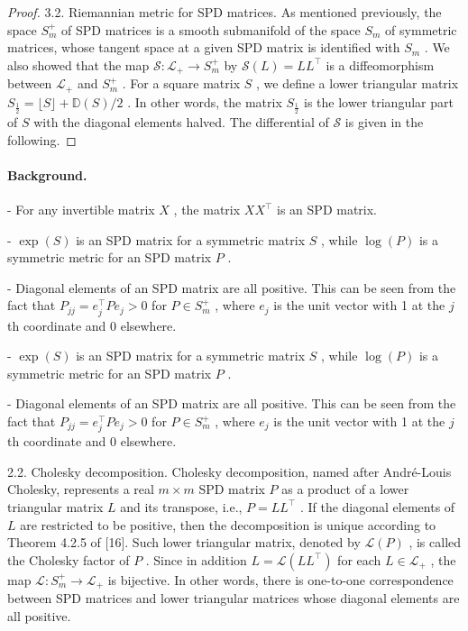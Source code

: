 \documentclass[11pt]{article}
\begin{document}
\begin{proof}
3.2. Riemannian metric for SPD matrices. As mentioned previously, the space  $S_{m}^{+}$  of SPD matrices is a smooth submanifold of the space  $S_{m}$  of symmetric matrices, whose tangent space at a given SPD matrix is identified with  $S_{m}$ . We also showed that the map  $\mathcal{S}:\mathcal{L}_{+}\to S_{m}^{+}$  by  $\mathcal{S}(L) = LL^{\top}$  is a diffeomorphism between  $\mathcal{L}_{+}$  and  $S_{m}^{+}$ . For a square matrix  $S$ , we define a lower triangular matrix  $S_{\frac{1}{2}} = \lfloor S\rfloor +\mathbb{D}(S) / 2$ . In other words, the matrix  $S_{\frac{1}{2}}$  is the lower triangular part of  $S$  with the diagonal elements halved. The differential of  $\mathcal{S}$  is given in the following.

\end{proof}

\paragraph{Background.}
- For any invertible matrix  $X$ , the matrix  $XX^{\top}$  is an SPD matrix.

-  $\exp(S)$  is an SPD matrix for a symmetric matrix  $S$ , while  $\log(P)$  is a symmetric metric for an SPD matrix  $P$ .

- Diagonal elements of an SPD matrix are all positive. This can be seen from the fact that  $P_{jj} = e_j^\top Pe_j > 0$  for  $P \in S_m^+$ , where  $e_j$  is the unit vector with 1 at the  $j$ th coordinate and 0 elsewhere.

-  $\exp(S)$  is an SPD matrix for a symmetric matrix  $S$ , while  $\log(P)$  is a symmetric metric for an SPD matrix  $P$ .

- Diagonal elements of an SPD matrix are all positive. This can be seen from the fact that  $P_{jj} = e_j^\top Pe_j > 0$  for  $P \in S_m^+$ , where  $e_j$  is the unit vector with 1 at the  $j$ th coordinate and 0 elsewhere.

2.2. Cholesky decomposition. Cholesky decomposition, named after André-Louis Cholesky, represents a real  $m \times m$  SPD matrix  $P$  as a product of a lower triangular matrix  $L$  and its transpose, i.e.,  $P = LL^{\top}$ . If the diagonal elements of  $L$  are restricted to be positive, then the decomposition is unique according to Theorem 4.2.5 of [16]. Such lower triangular matrix, denoted by  $\mathcal{L}(P)$ , is called the Cholesky factor of  $P$ . Since in addition  $L = \mathcal{L}(LL^{\top})$  for each  $L \in \mathcal{L}_{+}$ , the map  $\mathcal{L}: S_{m}^{+} \to \mathcal{L}_{+}$  is bijective. In other words, there is one-to-one correspondence between SPD matrices and lower triangular matrices whose diagonal elements are all positive.
\end{document}
